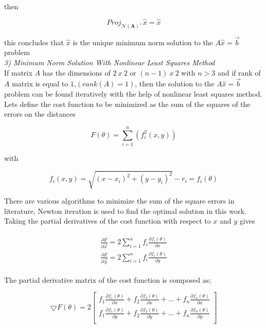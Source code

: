then 
  
\begin{equation}
Proj_{ \mathcal{N}(\mathbf{A})^\perp}\hat{x} = \hat{x}
\end{equation}
  
this concludes that $\hat{x}$ is the unique minimum norm solution to the $A\hat{x} = \vec{b}$ problem\\
	
	
\textit{3) Minimum Norm Solution With Nonlinear Least Squares Method}\\	
If matrix $A$ has the dimensions of $2\ x\ 2$ or $(n-1)\ x\ 2$ with $n>3$ and if rank of $A$ matrix is equal to $1$,$(rank(A) = 1)$, then the solution to the $A\hat{x} = \vec{b}$ problem can be found iteratively with the help of nonlinear least squares method. Lets define the cost function to be minimized 	as the sum of the squares of the errors on the distances \cite{22}
	
\begin{equation}
F(\theta) = \sum_{i=1}^{n} \left(f_i^2(x,y)\right)
\end{equation}
	
with
	
\begin{equation}
f_i(x,y) = \sqrt{(x-x_i)^2 + (y - y_i)^2} - r_i = f_i(\theta) 
\end{equation}

There are various algorithms to minimize the sum of the square errors in literature, Newton iteration is used to find the optimal solution in this work.  Taking the partial derivatives of the cost function with respect to $x$ and $y$ gives 

\begin{align}
\begin{split}
\frac{\partial{F}}{\partial{\vec{x}}} = 2\sum_{i=1}^{n}f_i\frac{\partial{f_i(\theta)}}{\partial{x}} \\
\frac{\partial{F}}{\partial{\vec{y}}} = 2\sum_{i=1}^{n}f_i\frac{\partial{f_i(\theta)}}{\partial{y}}
\end{split}
\end{align}

The partial derivative matrix of the cost function is composed as;

\begin{equation}
\bigtriangledown{F(\theta)} = 2 
\begin{bmatrix}
f_1\frac{\partial{f_1(\theta)}}{\partial{x}} + f_2\frac{\partial{f_2(\theta)}}{\partial{x}} + ... + f_n\frac{\partial{f_n(\theta)}}{\partial{x}} \\
f_1\frac{\partial{f_1(\theta)}}{\partial{y}} + f_2\frac{\partial{f_2(\theta)}}{\partial{y}} + ... + f_n\frac{\partial{f_n(\theta)}}{\partial{y}} \\
\end{bmatrix}
\end{equation}	
	
